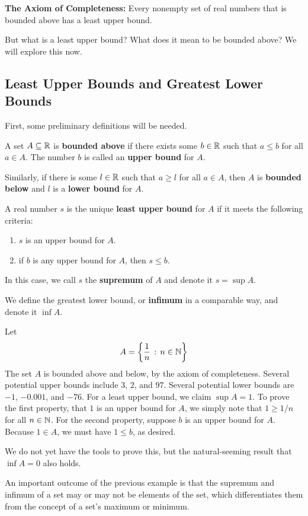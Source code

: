 \textbf{The Axiom of Completeness:} Every nonempty set of real numbers that is bounded above has a least upper bound.

But what is a least upper bound? What does it mean to be bounded above? We will explore this now.
\subsection*{Least Upper Bounds and Greatest Lower Bounds}
First, some preliminary definitions will be needed.
\begin{definition}
    A set $A\subseteq \mathbb{R}$ is \textbf{bounded above} if there exists some $b\in \mathbb{R}$ such that $a \leq b$ for all $a\in A$. The number $b$ is called an \textbf{upper bound} for $A$.

    Similarly, if there is some $l\in \mathbb{R}$ such that $a \geq l$ for all $a\in A$, then $A$ is \textbf{bounded below} and $l$ is a \textbf{lower bound} for $A$. 
\end{definition}
\begin{definition}
    A real number $s$ is the unique \textbf{least upper bound} for $A$ if it meets the following criteria:
    \begin{enumerate}
        \item $s$ is an upper bound for $A$.
        \item if $b$ is any upper bound for $A$, then $s \leq b$.
    \end{enumerate}
    In this case, we call $s$ the \textbf{supremum} of $A$ and denote it $s = \sup A$. 
\end{definition}
We define the greatest lower bound, or \textbf{infimum} in a comparable way, and denote it $\inf A$. 
\begin{example}
    Let
    \[ A = \left\{\frac{1}{n} \, : \, n\in\mathbb{N} \right\}\]
    The set $A$ is bounded above and below, by the axiom of completeness. Several potential upper bounds include $3$, $2$, and $97$. Several potential lower bounds are $-1$, $-0.001$, and $-76$. For a least upper bound, we claim $\sup A = 1$. To prove the first property, that $1$ is an upper bound for $A$, we simply note that $1 \geq 1/n$ for all $n\in\mathbb{N}$. For the second property, suppose $b$ is an upper bound for $A$. Because $1\in A$, we must have $1 \leq b$, as desired.

    We do not yet have the tools to prove this, but the natural-seeming result that $\inf A = 0$ also holds. 
\end{example}
An important outcome of the previous example is that the supremum and infimum of a set may or may not be elements of the set, which differentiates them from the concept of a set's maximum or minimum.

